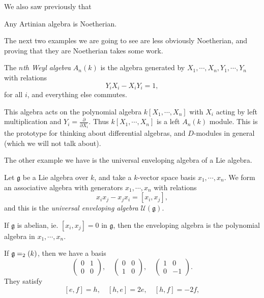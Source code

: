 \documentclass[a4paper]{article}
\begin{document}
We also saw previously that
\begin{eg}
  Any Artinian algebra is Noetherian.
\end{eg}

The next two examples we are going to see are less obviously Noetherian, and proving that they are Noetherian takes some work.

\begin{defi}
  The \emph{$n$th Weyl algebra} $A_n(k)$ is the algebra generated by $X_1, \cdots, X_n, Y_1, \cdots, Y_n$ with relations
  \[
    Y_i X_i - X_i Y_i = 1,
  \]
  for all $i$, and everything else commutes.
\end{defi}

This algebra acts on the polynomial algebra $k[X_1, \cdots, X_n]$ with $X_i$ acting by left multiplication and $Y_i = \frac{\partial}{\partial X_i}$. Thus $k[X_1, \cdots, X_n]$ is a left $A_n(k)$ module. This is the prototype for thinking about differential algebras, and $D$-modules in general (which we will not talk about).

The other example we have is the universal enveloping algebra of a Lie algebra.
\begin{defi}
  Let $\mathfrak{g}$ be a Lie algebra over $k$, and take a $k$-vector space basis $x_1, \cdots, x_n$. We form an associative algebra with generators $x_1, \cdots, x_n$ with relations
  \[
    x_i x_j - x_j x_i = [x_i, x_j],
  \]
  and this is the \emph{universal enveloping algebra} $\mathcal{U}(\mathfrak{g})$.
\end{defi}

\begin{eg}
  If $\mathfrak{g}$ is abelian, ie. $[x_i, x_j] = 0$ in $\mathfrak{g}$, then the enveloping algebra is the polynomial algebra in $x_1, \cdots, x_n$.
\end{eg}

\begin{eg}
  If $\mathfrak{g} = \sl_2(k)$, then we have a basis
  \[
    \begin{pmatrix}
      0 & 1\\
      0 & 0
    \end{pmatrix},\quad
    \begin{pmatrix}
      0 & 0\\
      1 & 0
    \end{pmatrix},\quad
    \begin{pmatrix}
      1 & 0\\
      0 & -1
    \end{pmatrix}.
  \]
  They satisfy
  \[
    [e, f] = h,\quad [h, e] = 2e,\quad [h, f] = -2f,
  \]
\end{eg}
\end{document}
